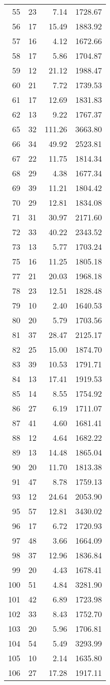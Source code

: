 \begin{appendix}
\begin{longtable}{rrrr}
55 & 23 & 7.14 & 1728.67 \\
56 & 17 & 15.49 & 1883.92 \\
57 & 16 & 4.12 & 1672.66 \\
58 & 17 & 5.86 & 1704.87 \\
59 & 12 & 21.12 & 1988.47 \\
60 & 21 & 7.72 & 1739.53 \\
61 & 17 & 12.69 & 1831.83 \\
62 & 13 & 9.22 & 1767.37 \\
65 & 32 & 111.26 & 3663.80 \\
66 & 34 & 49.92 & 2523.81 \\
67 & 22 & 11.75 & 1814.34 \\
68 & 29 & 4.38 & 1677.34 \\
69 & 39 & 11.21 & 1804.42 \\
70 & 29 & 12.81 & 1834.08 \\
71 & 31 & 30.97 & 2171.60 \\
72 & 33 & 40.22 & 2343.52 \\
73 & 13 & 5.77 & 1703.24 \\
75 & 16 & 11.25 & 1805.18 \\
77 & 21 & 20.03 & 1968.18 \\
78 & 23 & 12.51 & 1828.48 \\
79 & 10 & 2.40 & 1640.53 \\
80 & 20 & 5.79 & 1703.56 \\
81 & 37 & 28.47 & 2125.17 \\
82 & 25 & 15.00 & 1874.70 \\
83 & 39 & 10.53 & 1791.71 \\
84 & 13 & 17.41 & 1919.53 \\
85 & 14 & 8.55 & 1754.92 \\
86 & 27 & 6.19 & 1711.07 \\
87 & 41 & 4.60 & 1681.41 \\
88 & 12 & 4.64 & 1682.22 \\
89 & 13 & 14.48 & 1865.04 \\
90 & 20 & 11.70 & 1813.38 \\
91 & 47 & 8.78 & 1759.13 \\
93 & 12 & 24.64 & 2053.90 \\
95 & 57 & 12.81 & 3430.02 \\
96 & 17 & 6.72 & 1720.93 \\
97 & 48 & 3.66 & 1664.09 \\
98 & 37 & 12.96 & 1836.84 \\
99 & 20 & 4.43 & 1678.41 \\
100 & 51 & 4.84 & 3281.90 \\
101 & 42 & 6.89 & 1723.98 \\
102 & 33 & 8.43 & 1752.70 \\
103 & 20 & 5.96 & 1706.81 \\
104 & 54 & 5.49 & 3293.99 \\
105 & 10 & 2.14 & 1635.80 \\
106 & 27 & 17.28 & 1917.11 \\
\bottomrule
\end{longtable}


\end{appendix}
